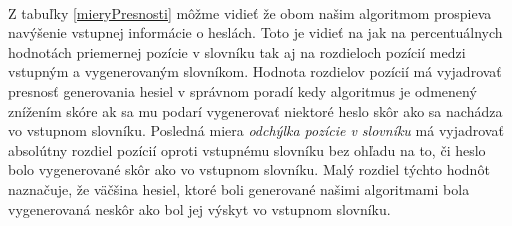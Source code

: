 \paragraph{}
Z tabuľky \ref{mieryPresnosti} môžme vidieť že obom našim algoritmom prospieva navýšenie vstupnej informácie o heslách. Toto je vidieť na jak na percentuálnych hodnotách priemernej pozície v slovníku tak aj na rozdieloch pozícií medzi vstupným a vygenerovaným slovníkom. Hodnota rozdielov pozícií má vyjadrovať presnosť generovania hesiel v správnom poradí kedy algoritmus je odmenený znížením skóre ak sa mu podarí vygenerovať niektoré heslo skôr ako sa nachádza vo vstupnom slovníku. Posledná miera \emph{odchýlka pozície v slovníku} má vyjadrovať absolútny rozdiel pozícií oproti vstupnému slovníku bez ohľadu na to, či heslo bolo vygenerované skôr ako vo vstupnom slovníku. Malý rozdiel týchto hodnôt naznačuje, že väčšina hesiel, ktoré boli generované našimi algoritmami bola vygenerovaná neskôr ako bol jej výskyt vo vstupnom slovníku.